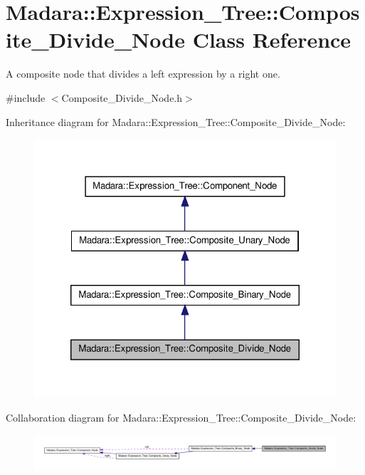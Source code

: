 \hypertarget{classMadara_1_1Expression__Tree_1_1Composite__Divide__Node}{
\section{Madara::Expression\_\-Tree::Composite\_\-Divide\_\-Node Class Reference}
\label{d3/d04/classMadara_1_1Expression__Tree_1_1Composite__Divide__Node}
}


A composite node that divides a left expression by a right one.  




{\ttfamily \#include $<$Composite\_\-Divide\_\-Node.h$>$}



Inheritance diagram for Madara::Expression\_\-Tree::Composite\_\-Divide\_\-Node:
\nopagebreak
\begin{figure}[H]
\begin{center}
\leavevmode
\includegraphics[width=322pt]{de/dc4/classMadara_1_1Expression__Tree_1_1Composite__Divide__Node__inherit__graph}
\end{center}
\end{figure}


Collaboration diagram for Madara::Expression\_\-Tree::Composite\_\-Divide\_\-Node:
\nopagebreak
\begin{figure}[H]
\begin{center}
\leavevmode
\includegraphics[width=400pt]{da/dac/classMadara_1_1Expression__Tree_1_1Composite__Divide__Node__coll__graph}
\end{center}
\end{figure}
